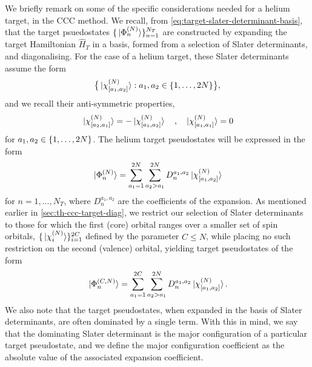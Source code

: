 \documentclass[]{article}
\begin{document}
We briefly remark on some of the specific considerations needed for a helium
target, in the CCC method.
We recall, from \autoref{eq:target-slater-determinant-basis}, that the target
psuedostates $\lbrace\ket*{\Phi_{n}^{(N)}}\rbrace_{n = 1}^{N_{T}}$ are constructed
by expanding the target Hamiltonian $\hat{H}_{T}$ in a basis, formed from a
selection of Slater determinants, and diagonalising.
For the case of a helium target, these Slater determinants assume the form
\begin{equation}
  \label{eq:he-target-slater-determinant-basis}
  \lrset[\big]
  {
    \ket*{\chi_{\lrsq{a_{1}, a_{2}}}^{\lr{N}}}
    :
    a_{1}, a_{2}
    \in
    \lrset{1, \dotsc, 2N}
  }
  ,
\end{equation}
and we recall their anti-symmetric properties,
\begin{equation*}
  \ket*{\chi_{\lrsq{a_{2}, a_{1}}}^{\lr{N}}}
  =
  -
  \ket*{\chi_{\lrsq{a_{1}, a_{2}}}^{\lr{N}}}
  \qq{,}
  \ket*{\chi_{\lrsq{a_{1}, a_{1}}}^{\lr{N}}}
  =
  0
\end{equation*}
for $a_{1}, a_{2} \in \lbrace1, \dotsc, 2N\rbrace$.
The helium target pseudostates will be expressed in the form
\begin{equation}
  \label{eq:he-target-states-expansion}
  \ket*{\Phi_{n}^{\lr{N}}}
  =
  \sum_{a_{1} = 1}^{2N}
  \sum_{a_{2} > a_{1}}^{2N}
  D_{n}^{a_{1}, a_{2}}
  \ket*{\chi_{\lrsq{a_{1}, a_{2}}}^{\lr{N}}}
\end{equation}
for $n = 1, \dotsc, N_{T}$, where $D_{n}^{a_{1}, a_{2}}$ are the coefficients of
the expansion.
As mentioned earlier in \autoref{sec:th-ccc-target-diag}, we restrict our
selection of Slater determinants to those for which the first (core) orbital
ranges over a smaller set of spin orbitals,
$\lbrace\ket*{\chi_{i}^{(N)}}\rbrace_{i = 1}^{2C}$ defined by the parameter
$C \leq N$, while placing no such restriction on the second (valence) orbital,
yielding target pseudostates of the form
\begin{equation}
  \label{eq:he-target-states-expansion-restricted}
  \ket*{\Phi_{n}^{\lr{C, N}}}
  =
  \sum_{a_{1} = 1}^{2C}
  \sum_{a_{2} > a_{1}}^{2N}
  D_{n}^{a_{1}, a_{2}}
  \ket*{\chi_{\lrsq{a_{1}, a_{2}}}^{\lr{N}}}
  .
\end{equation}
We also note that the target pseudostates, when expanded in the basis of Slater
determinants, are often dominated by a single term.
With this in mind, we say that the dominating Slater determinant is the major
configuration of a particular target pseudostate, and we define the major
configuration coefficient as the absolute value of the associated expansion
coefficient.
\end{document}
